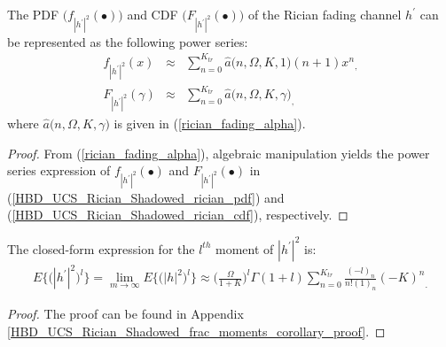 \begin{corollary} \label{HBD_UCS_Rician_Shadowed_rician_pdf_cdf_corollary}
The PDF $\big(f_{|h^{'}|^2}(\bullet)\big)$ and CDF $\big(F_{|h^{'}|^2}(\bullet)\big)$ of the Rician fading channel $h^{'}$ can be represented as the following power series:
\begin{eqnarray}
f_{|h^{'}|^2}(x) & \approx & \sum_{n=0}^{K_{tr}} \widehat{a}\big(n,\Omega,K,1\big)(n+1){x^n}_, \label{HBD_UCS_Rician_Shadowed_rician_pdf} \\
F_{|h^{'}|^2}(\gamma) & \approx & \sum_{n=0}^{K_{tr}} \widehat{a}\big(n,\Omega,K,\gamma\big)_, \label{HBD_UCS_Rician_Shadowed_rician_cdf}
\end{eqnarray}
where $\widehat{a}\big(n,\Omega,K,\gamma\big)$ is given in (\ref{rician_fading_alpha}).
\end{corollary}
\begin{proof}
From (\ref{rician_fading_alpha}), algebraic manipulation yields the power series expression of $f_{|h^{'}|^2}(\bullet)$ and $F_{|h^{'}|^2}(\bullet)$ in (\ref{HBD_UCS_Rician_Shadowed_rician_pdf}) and (\ref{HBD_UCS_Rician_Shadowed_rician_cdf}), respectively.
\end{proof}

\begin{corollary} \label{HBD_UCS_Rician_Shadowed_frac_moments_corollary}
The closed-form expression for the $l^{th}$ moment of $|h^{'}|^2$ is: 
\begin{eqnarray} \label{HBD_UCS_Rician_Shadowed_frac_moments_corollary_comp_limits}
E\big\{\big(|h^{'}|^2\big)^{l}\big\} = \lim_{m\to\infty}E\big\{\big(|h|^2\big)^l\big\} \approx \bigg(\frac{\Omega}{1+K}\bigg)^l \Gamma(1+l) \sum_{n=0}^{K_{tr}} \frac{(-l)_n}{n!(1)_n}{(-K)^n}_.
\end{eqnarray}
\end{corollary}
\begin{proof}
The proof can be found in Appendix \ref{HBD_UCS_Rician_Shadowed_frac_moments_corollary_proof}.
\end{proof}

